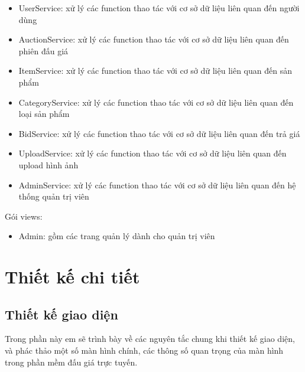 \documentclass[../DoAn.tex]{subfiles}
\begin{document}
\begin{itemize}
    \item UserService: xử lý các function thao tác với cơ sở dữ liệu liên quan đến người dùng
    \item AuctionService: xử lý các function thao tác với cơ sở dữ liệu liên quan đến phiên đấu giá
    \item ItemService: xử lý các function thao tác với cơ sở dữ liệu liên quan đến sản phẩm
    \item CategoryService: xử lý các function thao tác với cơ sở dữ liệu liên quan đến loại sản phẩm
    \item BidService: xử lý các function thao tác với cơ sở dữ liệu liên quan đến trả giá
    \item UploadService: xử lý các function thao tác với cơ sở dữ liệu liên quan đến upload hình ảnh
    \item AdminService: xử lý các function thao tác với cơ sở dữ liệu liên quan đến hệ thống quản trị viên
\end{itemize}
Gói views: 
\begin{itemize}
    \item Admin: gồm các trang quản lý dành cho quản trị viên
\end{itemize}
\section{Thiết kế chi tiết}
\subsection{Thiết kế giao diện}
Trong phần này em sẽ trình bày về các nguyên tắc chung khi thiết kế giao diện, và phác thảo một số màn hình chính, các thông số quan trọng của màn hình trong phần mềm đấu giá trực tuyến.
\end{document}

